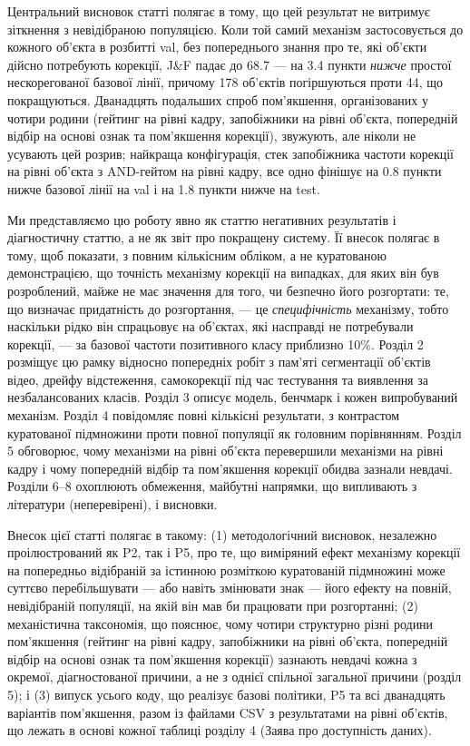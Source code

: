\documentclass[11pt]{article}
\begin{document}
Центральний висновок статті полягає в тому, що цей результат не витримує зіткнення з невідібраною популяцією. Коли той самий механізм застосовується до кожного об'єкта в розбитті val, без попереднього знання про те, які об'єкти дійсно потребують корекції, J\&F падає до 68.7 --- на 3.4 пункти \emph{нижче} простої нескорегованої базової лінії, причому 178 об'єктів погіршуються проти 44, що покращуються. Дванадцять подальших спроб пом'якшення, організованих у чотири родини (гейтинг на рівні кадру, запобіжники на рівні об'єкта, попередній відбір на основі ознак та пом'якшення корекції), звужують, але ніколи не усувають цей розрив; найкраща конфігурація, стек запобіжника частоти корекції на рівні об'єкта з AND-гейтом на рівні кадру, все одно фінішує на 0.8 пункти нижче базової лінії на val і на 1.8 пункти нижче на test.

Ми представляємо цю роботу явно як статтю негативних результатів і діагностичну статтю, а не як звіт про покращену систему. Її внесок полягає в тому, щоб показати, з повним кількісним обліком, а не куратованою демонстрацією, що точність механізму корекції на випадках, для яких він був розроблений, майже не має значення для того, чи безпечно його розгортати: те, що визначає придатність до розгортання, --- це \emph{специфічність} механізму, тобто наскільки рідко він спрацьовує на об'єктах, які насправді не потребували корекції, --- за базової частоти позитивного класу приблизно 10\%. Розділ 2 розміщує цю рамку відносно попередніх робіт з пам'яті сегментації об'єктів відео, дрейфу відстеження, самокорекції під час тестування та виявлення за незбалансованих класів. Розділ 3 описує модель, бенчмарк і кожен випробуваний механізм. Розділ 4 повідомляє повні кількісні результати, з контрастом куратованої підмножини проти повної популяції як головним порівнянням. Розділ 5 обговорює, чому механізми на рівні об'єкта перевершили механізми на рівні кадру і чому попередній відбір та пом'якшення корекції обидва зазнали невдачі. Розділи 6--8 охоплюють обмеження, майбутні напрямки, що випливають з літератури (неперевірені), і висновки.

Внесок цієї статті полягає в такому: (1) методологічний висновок, незалежно проілюстрований як P2, так і P5, про те, що виміряний ефект механізму корекції на попередньо відібраній за істинною розміткою куратованій підмножині може суттєво перебільшувати --- або навіть змінювати знак --- його ефекту на повній, невідібраній популяції, на якій він мав би працювати при розгортанні; (2) механістична таксономія, що пояснює, чому чотири структурно різні родини пом'якшення (гейтинг на рівні кадру, запобіжники на рівні об'єкта, попередній відбір на основі ознак та пом'якшення корекції) зазнають невдачі кожна з окремої, діагностованої причини, а не з однієї спільної загальної причини (розділ 5); і (3) випуск усього коду, що реалізує базові політики, P5 та всі дванадцять варіантів пом'якшення, разом із файлами CSV з результатами на рівні об'єктів, що лежать в основі кожної таблиці розділу 4 (Заява про доступність даних).
\end{document}
